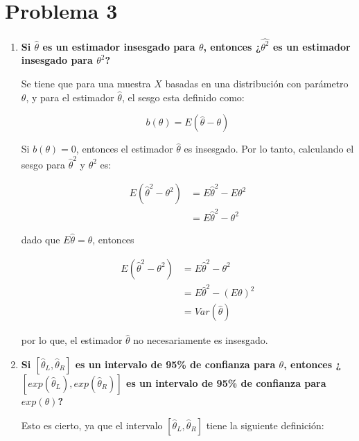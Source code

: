 \section*{Problema 3}

\begin{enumerate}
    \item \textbf{Si $\hat{\theta}$ es un estimador insesgado para $\theta$, entonces ¿$\hat{\theta^2}$ es un estimador insesgado para $\theta^2$?}

          Se tiene que para una muestra $X$ basadas en una distribución con parámetro $\theta$, y para el estimador $\hat{\theta}$, el sesgo esta definido como:

          \begin{equation*}
              b(\theta) = E(\hat{\theta}-\theta)
          \end{equation*}

          Si $b(\theta)=0$, entonces el estimador $\hat{\theta}$ es insesgado. Por lo tanto, calculando el sesgo para $\hat{\theta}^2$ y $\theta^2$ es:

          \begin{align*}
              E(\hat{\theta}^2 - \theta^2) & = E \hat{\theta}^2 - E\theta^2 \\
                                           & = E\hat{\theta}^2 - \theta^2
          \end{align*}

          dado que $E\hat{\theta} = \theta$, entonces

          \begin{align*}
              E(\hat{\theta}^2 - \theta^2) & = E\hat{\theta}^2 -  \theta^2   \\
                                           & = E\hat{\theta}^2 - (E\theta)^2 \\
                                           & = Var(\hat{\theta})
          \end{align*}

          por lo que, el estimador $\hat{\theta}$ no necesariamente es insesgado.

    \item \textbf{Si $[\hat{\theta}_L, \hat{\theta}_R]$ es un intervalo de 95\% de confianza para $\theta$, entonces ¿$[exp(\hat{\theta}_L),exp(\hat{\theta}_R)]$ es un intervalo de 95\% de confianza para $exp(\theta)$?}

          Esto es cierto, ya que el intervalo $[\hat{\theta}_L, \hat{\theta}_R]$ tiene la siguiente definición:


\end{enumerate}
